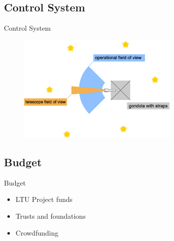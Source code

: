 \documentclass[11pt, aspectratio=169]{beamer}
\begin{document}

\subsection{Control System}
\begin{frame}[t]{Control System}
    \vspace{-0.5cm}
    \begin{figure}
        \centering
        \includegraphics[width=0.7\textwidth]{figures/images/FoV_telescope.eps}
        \label{fig:FoV}
    \end{figure}
\end{frame}


\subsection{Budget} 			%
\begin{frame}{Budget}
\begin{itemize}
	\item LTU Project funds
	\item Trusts and foundations
	\item Crowdfunding
\end{itemize}
\end{frame}
\end{document}
